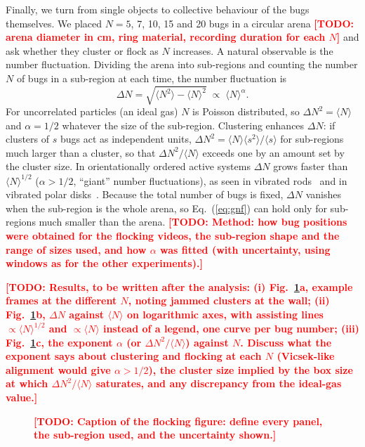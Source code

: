 \documentclass[11pt]{article}
\newcommand{\todo}[1]{\textcolor{red}{\textbf{[TODO: #1]}}}
\begin{document}
Finally, we turn from single objects to collective behaviour of the bugs themselves.
We placed $N=5$, 7, 10, 15 and 20 bugs in a circular arena \todo{arena diameter in cm, ring material, recording duration for each $N$} and ask whether they cluster or flock as $N$ increases.
A natural observable is the number fluctuation.
Dividing the arena into sub-regions and counting the number $N$ of bugs in a sub-region at each time, the number fluctuation is
\begin{equation}
  \Delta N=\sqrt{\langle N^2\rangle-\langle N\rangle^2}\;\propto\;\langle N\rangle^{\alpha}.
  \label{eq:gnf}
\end{equation}
For uncorrelated particles (an ideal gas) $N$ is Poisson distributed, so $\Delta N^2=\langle N\rangle$ and $\alpha=1/2$ whatever the size of the sub-region.
Clustering enhances $\Delta N$: if clusters of $s$ bugs act as independent units, $\Delta N^2=\langle N\rangle\langle s^2\rangle/\langle s\rangle$ for sub-regions much larger than a cluster, so that $\Delta N^2/\langle N\rangle$ exceeds one by an amount set by the cluster size.
In orientationally ordered active systems $\Delta N$ grows faster than $\langle N\rangle^{1/2}$ ($\alpha>1/2$, ``giant'' number fluctuations), as seen in vibrated rods~\cite{Narayan2007} and in vibrated polar disks~\cite{Deseigne2010}.
Because the total number of bugs is fixed, $\Delta N$ vanishes when the sub-region is the whole arena, so Eq.~(\ref{eq:gnf}) can hold only for sub-regions much smaller than the arena.
\todo{Method: how bug positions were obtained for the flocking videos, the sub-region shape and the range of sizes used, and how $\alpha$ was fitted (with uncertainty, using windows as for the other experiments).}

\todo{Results, to be written after the analysis: (i) Fig.~\ref{fig:flock}a, example frames at the different $N$, noting jammed clusters at the wall; (ii) Fig.~\ref{fig:flock}b, $\Delta N$ against $\langle N\rangle$ on logarithmic axes, with assisting lines $\propto\langle N\rangle^{1/2}$ and $\propto\langle N\rangle$ instead of a legend, one curve per bug number; (iii) Fig.~\ref{fig:flock}c, the exponent $\alpha$ (or $\Delta N^2/\langle N\rangle$) against $N$. Discuss what the exponent says about clustering and flocking at each $N$ (Vicsek-like alignment would give $\alpha>1/2$), the cluster size implied by the box size at which $\Delta N^2/\langle N\rangle$ saturates, and any discrepancy from the ideal-gas value.}

\begin{figure}[tb]
  \centering
  \fbox{\parbox[c][6.5cm][c]{0.94\linewidth}{\centering \todo{Figure~4: flocking. (a) example frames for $N=5,7,10,15,20$; (b) $\Delta N$ vs $\langle N\rangle$ (log--log, guides $\propto\langle N\rangle^{1/2}$ and $\propto\langle N\rangle$); (c) exponent $\alpha$ vs $N$.}}}
  \caption{\todo{Caption of the flocking figure: define every panel, the sub-region used, and the uncertainty shown.}}
  \label{fig:flock}
\end{figure}
\end{document}
